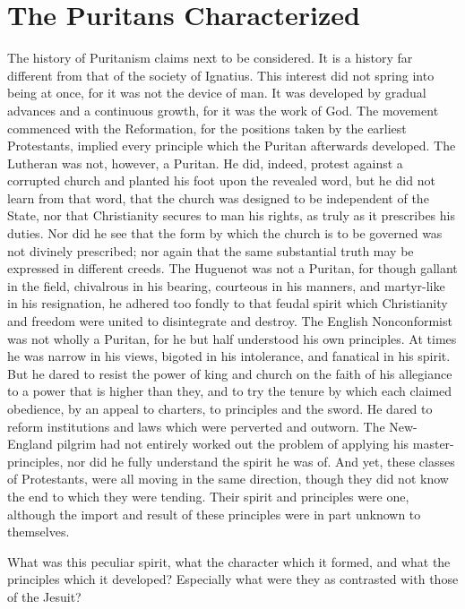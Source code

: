 \documentclass[]{book}
\begin{document}
\hypertarget{the-puritans-characterized}{%
\chapter{The Puritans Characterized}\label{the-puritans-characterized}}

The history of Puritanism claims next to be considered. It is a history far different from that of the society of Ignatius. This interest did not spring into being at once, for it was not the device of man. It was developed by gradual advances and a continuous growth, for it was the work of God. The movement commenced with the Reformation, for the positions taken by the earliest Protestants, implied every principle which the Puritan afterwards developed. The Lutheran was not, however, a Puritan. He did, indeed, protest against a corrupted church and planted his foot upon the revealed word, but he did not learn from that word, that the church was designed to be independent of the State, nor that Christianity secures to man his rights, as truly as it prescribes his duties. Nor did he see that the form by which the church is to be governed was not divinely prescribed; nor again that the same substantial truth may be expressed in different creeds. The Huguenot was not a Puritan, for though gallant in the field, chivalrous in his bearing, courteous in his manners, and martyr-like in his resignation, he adhered too fondly to that feudal spirit which Christianity and freedom were united to disintegrate and destroy. The English Nonconformist was not wholly a Puritan, for he but half understood his own principles. At times he was narrow in his views, bigoted in his intolerance, and fanatical in his spirit. But he dared to resist the power of king and church on the faith of his allegiance to a power that is higher than they, and to try the tenure by which each claimed obedience, by an appeal to charters, to principles and the sword. He dared to reform institutions and laws which were perverted and outworn. The New- England pilgrim had not entirely worked out the problem of applying his master-principles, nor did he fully understand the spirit he was of. And yet, these classes of Protestants, were all moving in the same direction, though they did not know the end to which they were tending. Their spirit and principles were one, although the import and result of these principles were in part unknown to themselves.

What was this peculiar spirit, what the character which it formed, and what the principles which it developed? Especially what were they as contrasted with those of the Jesuit?
\end{document}

